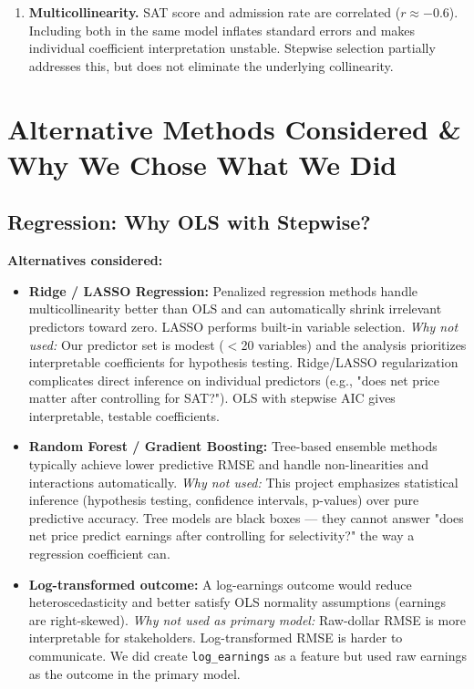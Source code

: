 \documentclass[12pt, letterpaper]{article}
\begin{document}
\begin{enumerate}
  \item \textbf{Multicollinearity.} SAT score and admission rate are correlated ($r \approx -0.6$). Including both in the same model inflates standard errors and makes individual coefficient interpretation unstable. Stepwise selection partially addresses this, but does not eliminate the underlying collinearity.
\end{enumerate}

\section{Alternative Methods Considered \& Why We Chose What We Did}

\subsection{Regression: Why OLS with Stepwise?}

\textbf{Alternatives considered:}

\begin{itemize}
  \item \textbf{Ridge / LASSO Regression:} Penalized regression methods handle multicollinearity better than OLS and can automatically shrink irrelevant predictors toward zero. LASSO performs built-in variable selection. \textit{Why not used:} Our predictor set is modest ($<$20 variables) and the analysis prioritizes interpretable coefficients for hypothesis testing. Ridge/LASSO regularization complicates direct inference on individual predictors (e.g., "does net price matter after controlling for SAT?"). OLS with stepwise AIC gives interpretable, testable coefficients.

  \item \textbf{Random Forest / Gradient Boosting:} Tree-based ensemble methods typically achieve lower predictive RMSE and handle non-linearities and interactions automatically. \textit{Why not used:} This project emphasizes statistical inference (hypothesis testing, confidence intervals, p-values) over pure predictive accuracy. Tree models are black boxes — they cannot answer "does net price predict earnings after controlling for selectivity?" the way a regression coefficient can.

  \item \textbf{Log-transformed outcome:} A log-earnings outcome would reduce heteroscedasticity and better satisfy OLS normality assumptions (earnings are right-skewed). \textit{Why not used as primary model:} Raw-dollar RMSE is more interpretable for stakeholders. Log-transformed RMSE is harder to communicate. We did create \texttt{log\_earnings} as a feature but used raw earnings as the outcome in the primary model.
\end{itemize}
\end{document}
